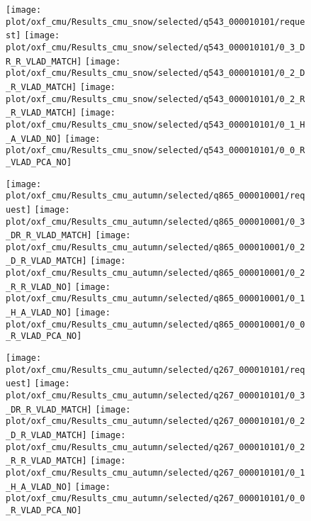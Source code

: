 \begin{figure}
\begin{minipage}{0.98\textwidth}
		\texttt{[image: plot/oxf\_cmu/Results\_cmu\_snow/selected/q543\_000010101/request]}\hfill
		\texttt{[image: plot/oxf\_cmu/Results\_cmu\_snow/selected/q543\_000010101/0\_3\_DR\_R\_VLAD\_MATCH]}\hfill
		\texttt{[image: plot/oxf\_cmu/Results\_cmu\_snow/selected/q543\_000010101/0\_2\_D\_R\_VLAD\_MATCH]}\hfill
		\texttt{[image: plot/oxf\_cmu/Results\_cmu\_snow/selected/q543\_000010101/0\_2\_R\_R\_VLAD\_MATCH]}\hfill
		\texttt{[image: plot/oxf\_cmu/Results\_cmu\_snow/selected/q543\_000010101/0\_1\_H\_A\_VLAD\_NO]}\hfill
		\texttt{[image: plot/oxf\_cmu/Results\_cmu\_snow/selected/q543\_000010101/0\_0\_R\_VLAD\_PCA\_NO]}
		
	\end{minipage}
	
	\begin{minipage}{0.02\textwidth}
	\end{minipage}\hfill
	\begin{minipage}{0.98\textwidth}
		\centering
		
		\texttt{[image: plot/oxf\_cmu/Results\_cmu\_autumn/selected/q865\_000010001/request]}\hfill
		\texttt{[image: plot/oxf\_cmu/Results\_cmu\_autumn/selected/q865\_000010001/0\_3\_DR\_R\_VLAD\_MATCH]}\hfill
		\texttt{[image: plot/oxf\_cmu/Results\_cmu\_autumn/selected/q865\_000010001/0\_2\_D\_R\_VLAD\_MATCH]}\hfill
		\texttt{[image: plot/oxf\_cmu/Results\_cmu\_autumn/selected/q865\_000010001/0\_2\_R\_R\_VLAD\_NO]}\hfill	
		\texttt{[image: plot/oxf\_cmu/Results\_cmu\_autumn/selected/q865\_000010001/0\_1\_H\_A\_VLAD\_NO]}\hfill	
		\texttt{[image: plot/oxf\_cmu/Results\_cmu\_autumn/selected/q865\_000010001/0\_0\_R\_VLAD\_PCA\_NO]}
		
		\texttt{[image: plot/oxf\_cmu/Results\_cmu\_autumn/selected/q267\_000010101/request]}\hfill
		\texttt{[image: plot/oxf\_cmu/Results\_cmu\_autumn/selected/q267\_000010101/0\_3\_DR\_R\_VLAD\_MATCH]}\hfill
		\texttt{[image: plot/oxf\_cmu/Results\_cmu\_autumn/selected/q267\_000010101/0\_2\_D\_R\_VLAD\_MATCH]}\hfill
		\texttt{[image: plot/oxf\_cmu/Results\_cmu\_autumn/selected/q267\_000010101/0\_2\_R\_R\_VLAD\_MATCH]}\hfill
		\texttt{[image: plot/oxf\_cmu/Results\_cmu\_autumn/selected/q267\_000010101/0\_1\_H\_A\_VLAD\_NO]}\hfill
		\texttt{[image: plot/oxf\_cmu/Results\_cmu\_autumn/selected/q267\_000010101/0\_0\_R\_VLAD\_PCA\_NO]}
		

\end{minipage}
\end{figure}
